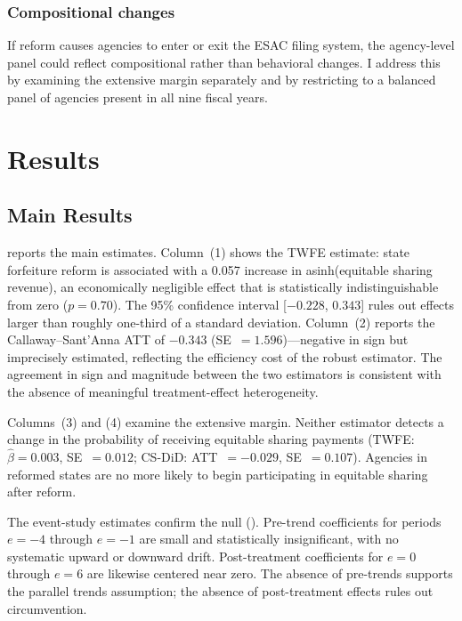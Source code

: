 \documentclass[12pt]{article}
\begin{document}
\subsubsection*{Compositional changes} If reform causes agencies to enter or exit the ESAC filing system, the agency-level panel could reflect compositional rather than behavioral changes. I address this by examining the extensive margin separately and by restricting to a balanced panel of agencies present in all nine fiscal years.


\section{Results}

\subsection{Main Results}



 reports the main estimates. Column~(1) shows the TWFE estimate: state forfeiture reform is associated with a 0.057 increase in asinh(equitable sharing revenue), an economically negligible effect that is statistically indistinguishable from zero ($p = 0.70$). The 95\% confidence interval [$-0.228$, $0.343$] rules out effects larger than roughly one-third of a standard deviation. Column~(2) reports the Callaway--Sant'Anna ATT of $-0.343$ (SE~$= 1.596$)---negative in sign but imprecisely estimated, reflecting the efficiency cost of the robust estimator. The agreement in sign and magnitude between the two estimators is consistent with the absence of meaningful treatment-effect heterogeneity.

Columns~(3) and (4) examine the extensive margin. Neither estimator detects a change in the probability of receiving equitable sharing payments (TWFE: $\hat{\beta} = 0.003$, SE~$= 0.012$; CS-DiD: ATT~$= -0.029$, SE~$= 0.107$). Agencies in reformed states are no more likely to begin participating in equitable sharing after reform.

The event-study estimates confirm the null (). Pre-trend coefficients for periods $e = -4$ through $e = -1$ are small and statistically insignificant, with no systematic upward or downward drift. Post-treatment coefficients for $e = 0$ through $e = 6$ are likewise centered near zero. The absence of pre-trends supports the parallel trends assumption; the absence of post-treatment effects rules out circumvention.
\end{document}
